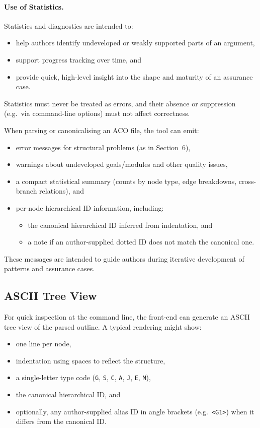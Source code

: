 \documentclass[11pt]{article}
\begin{document}
\paragraph{Use of Statistics.}
Statistics and diagnostics are intended to:
\begin{itemize}[leftmargin=2em]
  \item help authors identify undeveloped or weakly supported parts of an argument,
  \item support progress tracking over time, and
  \item provide quick, high-level insight into the shape and maturity of an assurance case.
\end{itemize}

Statistics must never be treated as errors, and their absence or suppression
(e.g.\ via command-line options) must not affect correctness.

When parsing or canonicalising an ACO file, the tool can emit:
\begin{itemize}[leftmargin=2em]
  \item error messages for structural problems (as in Section~6),
  \item warnings about undeveloped goals/modules and other quality issues,
  \item a compact statistical summary (counts by node type, edge breakdowns, cross-branch relations), and
  \item per-node hierarchical ID information, including:
    \begin{itemize}[leftmargin=1.5em]
      \item the canonical hierarchical ID inferred from indentation, and
      \item a note if an author-supplied dotted ID does not match the canonical one.
    \end{itemize}
\end{itemize}

These messages are intended to guide authors during iterative development of patterns and assurance cases.

\subsection*{ASCII Tree View}

For quick inspection at the command line, the front-end can generate an ASCII tree view of the parsed outline. A typical rendering might show:

\begin{itemize}[leftmargin=2em]
  \item one line per node,
  \item indentation using spaces to reflect the structure,
  \item a single-letter type code (\texttt{G}, \texttt{S}, \texttt{C}, \texttt{A}, \texttt{J}, \texttt{E}, \texttt{M}),
  \item the canonical hierarchical ID, and
  \item optionally, any author-supplied alias ID in angle brackets (e.g.\ \texttt{<G1>}) when it differs from the canonical ID.
\end{itemize}
\end{document}
